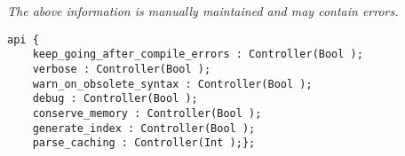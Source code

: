 \label{pkg:control}

{\tiny \it The above information is manually maintained and may contain errors.}
\begin{verbatim}
api {
    keep_going_after_compile_errors : Controller(Bool );
    verbose : Controller(Bool );
    warn_on_obsolete_syntax : Controller(Bool );
    debug : Controller(Bool );
    conserve_memory : Controller(Bool );
    generate_index : Controller(Bool );
    parse_caching : Controller(Int );};
\end{verbatim}
